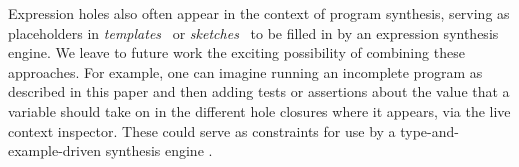 
Expression holes also often appear in the context of program synthesis, serving as
placeholders in \emph{templates}~\cite{srivastava2013template} or
\emph{sketches}~\cite{solar2009sketching} to be filled in by an expression
synthesis engine. We leave to future work the exciting possibility of combining these approaches. For example, one can imagine running an incomplete program as described in this paper and then adding tests or assertions about the value that a variable should take on in the different hole closures where it appears, via the live context inspector. These could serve as  constraints for use by a type-and-example-driven synthesis engine \cite{DBLP:conf/popl/FrankleOWZ16}. 




 




